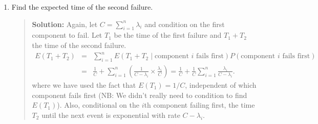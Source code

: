 \documentclass{article}
\begin{document}
\begin{enumerate}
\begin{enumerate}
  \item Find the expected time of the second failure.
  \begin{quotation}{\bf Solution:}
  Again, let $C=\sum_{i=1}^n\lambda_i$ and
  condition on the first component to fail.  Let $T_1$ be the time of the first failure and
  $T_1+T_2$ the time of the second failure.
  \begin{eqnarray*}
  E(T_1 + T_2)  &=&
  \sum_{i=1}^n E(T_1 + T_2 \mid \mbox{component $i$ fails first})
  P(\mbox{component $i$ fails first}) 
  \\ &=&
  \frac{1}{C} +
  \sum_{i=1}^n \left( \frac{1}{C-\lambda_i} \times \frac{\lambda_i}{C} \right) =
  \frac1C + \frac1C\sum_{i=1}^n \frac{\lambda_i}{C-\lambda_i}.
  \end{eqnarray*}
  where we have used the fact that $E(T_1)=1/C$, independent of which component
  fails first (NB:  We didn't really need to condition to find $E(T_1)$).  Also, conditional on the $i$th component failing first, the time $T_2$ until
  the next event is exponential with rate $C-\lambda_i$.
  \end{quotation}

  \end{enumerate}

\end{enumerate}
\end{document}
